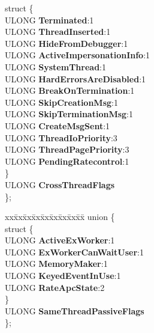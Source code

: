 \begin{DoxyCompactItemize}
\begin{tabbing}
\mbox{\label{union___e_t_h_r_e_a_d_1_1_0D2215_a021b95ead4458d9e56776fb9d66d083b}} 
\>struct \{\\
\>\>ULONG {\bfseries Terminated}:1\\
\>\>ULONG {\bfseries ThreadInserted}:1\\
\>\>ULONG {\bfseries HideFromDebugger}:1\\
\>\>ULONG {\bfseries ActiveImpersonationInfo}:1\\
\>\>ULONG {\bfseries SystemThread}:1\\
\>\>ULONG {\bfseries HardErrorsAreDisabled}:1\\
\>\>ULONG {\bfseries BreakOnTermination}:1\\
\>\>ULONG {\bfseries SkipCreationMsg}:1\\
\>\>ULONG {\bfseries SkipTerminationMsg}:1\\
\>\>ULONG {\bfseries CreateMsgSent}:1\\
\>\>ULONG {\bfseries ThreadIoPriority}:3\\
\>\>ULONG {\bfseries ThreadPagePriority}:3\\
\>\>ULONG {\bfseries PendingRatecontrol}:1\\
\>\} \\
\>ULONG {\bfseries CrossThreadFlags}\\
\}; \\

\end{tabbing}\item 
\mbox{\label{struct___e_t_h_r_e_a_d_afff19a6c96a038ed36bdf7cd236a827b}} 
\begin{tabbing}
xx\=xx\=xx\=xx\=xx\=xx\=xx\=xx\=xx\=\kill
union \{\\
\mbox{\label{union___e_t_h_r_e_a_d_1_1_0D2217_a159bf26567f29c1e8f18eafce9bc296e}} 
\>struct \{\\
\>\>ULONG {\bfseries ActiveExWorker}:1\\
\>\>ULONG {\bfseries ExWorkerCanWaitUser}:1\\
\>\>ULONG {\bfseries MemoryMaker}:1\\
\>\>ULONG {\bfseries KeyedEventInUse}:1\\
\>\>ULONG {\bfseries RateApcState}:2\\
\>\} \\
\>ULONG {\bfseries SameThreadPassiveFlags}\\
\}; \\


\end{tabbing}
\end{DoxyCompactItemize}
